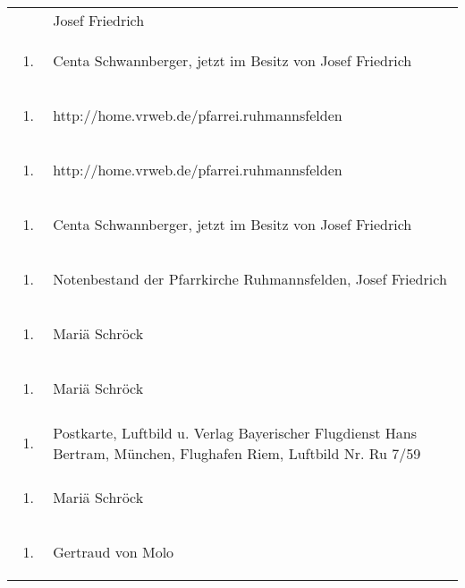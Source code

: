 \documentclass[a4paper]{article}
\begin{document}
\begin{flushleft}
\begin{supertabular}{m{1.2409999cm}m{14.604cm}}
\begin{enumerate}
\end{enumerate}
 &
Josef Friedrich\\
\begin{enumerate}
\item 
\end{enumerate}
 &
Centa Schwannberger, jetzt im Besitz von Josef Friedrich\\
\begin{enumerate}
\item 
\end{enumerate}
 &
http://home.vrweb.de/pfarrei.ruhmannsfelden\\
\begin{enumerate}
\item 
\end{enumerate}
 &
http://home.vrweb.de/pfarrei.ruhmannsfelden\\
\begin{enumerate}
\item 
\end{enumerate}
 &
Centa Schwannberger, jetzt im Besitz von Josef Friedrich\\
\begin{enumerate}
\item 
\end{enumerate}
 &
Notenbestand der Pfarrkirche Ruhmannsfelden, Josef Friedrich\\
\begin{enumerate}
\item 
\end{enumerate}
 &
Mariä Schröck\\
\begin{enumerate}
\item 
\end{enumerate}
 &
Mariä Schröck\\
\begin{enumerate}
\item 
\end{enumerate}
 &
Postkarte, Luftbild u. Verlag Bayerischer Flugdienst Hans Bertram,
München, Flughafen Riem, Luftbild Nr. Ru 7/59\\
\begin{enumerate}
\item 
\end{enumerate}
 &
Mariä Schröck\\
\begin{enumerate}
\item 
\end{enumerate}
 &
Gertraud von Molo\\

\end{supertabular}
\end{flushleft}
\end{document}
